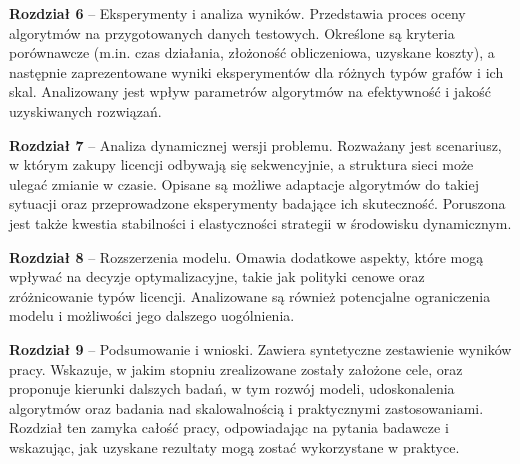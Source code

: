 \begin{description}
  \item \textbf{Rozdział 6} -- Eksperymenty i analiza wyników. Przedstawia proces oceny algorytmów na przygotowanych danych testowych. Określone są kryteria porównawcze (m.in. czas działania, złożoność obliczeniowa, uzyskane koszty), a następnie zaprezentowane wyniki eksperymentów dla różnych typów grafów i ich skal. Analizowany jest wpływ parametrów algorytmów na efektywność i jakość uzyskiwanych rozwiązań.

  \item \textbf{Rozdział 7} -- Analiza dynamicznej wersji problemu. Rozważany jest scenariusz, w którym zakupy licencji odbywają się sekwencyjnie, a struktura sieci może ulegać zmianie w czasie. Opisane są możliwe adaptacje algorytmów do takiej sytuacji oraz przeprowadzone eksperymenty badające ich skuteczność. Poruszona jest także kwestia stabilności i elastyczności strategii w środowisku dynamicznym.

  \item \textbf{Rozdział 8} -- Rozszerzenia modelu. Omawia dodatkowe aspekty, które mogą wpływać na decyzje optymalizacyjne, takie jak polityki cenowe oraz zróżnicowanie typów licencji. Analizowane są również potencjalne ograniczenia modelu i możliwości jego dalszego uogólnienia.

  \item \textbf{Rozdział 9} -- Podsumowanie i wnioski. Zawiera syntetyczne zestawienie wyników pracy. Wskazuje, w jakim stopniu zrealizowane zostały założone cele, oraz proponuje kierunki dalszych badań, w tym rozwój modeli, udoskonalenia algorytmów oraz badania nad skalowalnością i praktycznymi zastosowaniami. Rozdział ten zamyka całość pracy, odpowiadając na pytania badawcze i wskazując, jak uzyskane rezultaty mogą zostać wykorzystane w praktyce.
\end{description}
